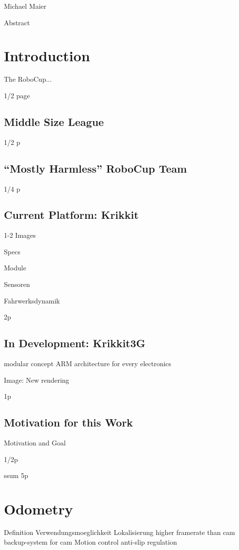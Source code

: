 \documentclass[12pt,a4paper]{article}
\begin{document}
{Michael Maier}

\tableofcontents
\clearpage
\pagestyle{plain}



Abstract

\section{Introduction}

The RoboCup...

1/2 page

\subsection{Middle Size League}
1/2 p

\subsection{``Mostly Harmless'' RoboCup Team}
1/4 p

\subsection{Current Platform: Krikkit}

1-2 Images
  
  Specs

    Module
      
    Sensoren
    
    Fahrwerksdynamik

2p

\subsection{In Development: Krikkit3G}

    modular concept
    ARM architecture for every electronics

Image: New rendering

1p

\subsection{Motivation for this Work}
    
Motivation and Goal

1/2p

ssum 5p

\section{Odometry}
  Definition
  Verwendungsmoeglichkeit
    Lokalisierung
      higher framerate than cam
      backup-system for cam
    Motion control
      anti-slip regulation
\end{document}
